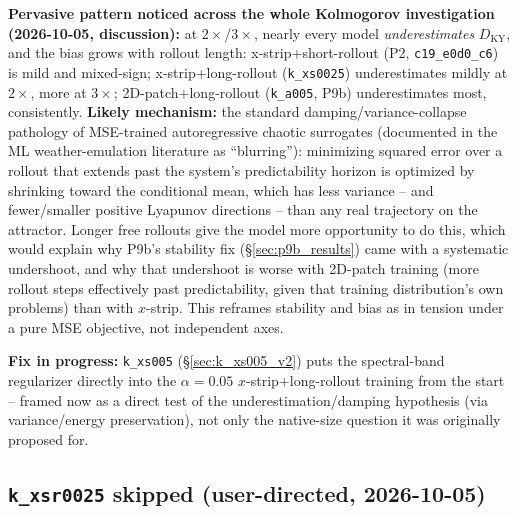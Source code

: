 \documentclass[11pt]{article}
\begin{document}
\textbf{Pervasive pattern noticed across the whole Kolmogorov
investigation (2026-10-05, discussion):} at $2\times$/$3\times$, nearly
every model \emph{underestimates} $D_{\mathrm{KY}}$, and the bias grows
with rollout length: x-strip+short-rollout (P2,
\texttt{c19\_e0d0\_c6}) is mild and mixed-sign; x-strip+long-rollout
(\texttt{k\_xs0025}) underestimates mildly at $2\times$, more at
$3\times$; 2D-patch+long-rollout (\texttt{k\_a005}, P9b) underestimates
most, consistently. \textbf{Likely mechanism:} the standard
damping/variance-collapse pathology of MSE-trained autoregressive
chaotic surrogates (documented in the ML weather-emulation literature as
``blurring''): minimizing squared error over a rollout that extends past
the system's predictability horizon is optimized by shrinking toward the
conditional mean, which has less variance -- and fewer/smaller positive
Lyapunov directions -- than any real trajectory on the attractor.
Longer free rollouts give the model more opportunity to do this, which
would explain why P9b's stability fix (\S\ref{sec:p9b_results}) came
with a systematic undershoot, and why that undershoot is worse with
2D-patch training (more rollout steps effectively past predictability,
given that training distribution's own problems) than with $x$-strip.
This reframes stability and bias as in tension under a pure MSE
objective, not independent axes.

\textbf{Fix in progress:} \texttt{k\_xs005} (\S\ref{sec:k_xs005_v2})
puts the spectral-band regularizer directly into the $\alpha{=}0.05$
$x$-strip+long-rollout training from the start -- framed now as a direct
test of the underestimation/damping hypothesis (via variance/energy
preservation), not only the native-size question it was originally
proposed for.

\subsection{\texttt{k\_xsr0025} skipped (user-directed, 2026-10-05)}
\label{sec:k_xsr0025_skipped}
\end{document}
